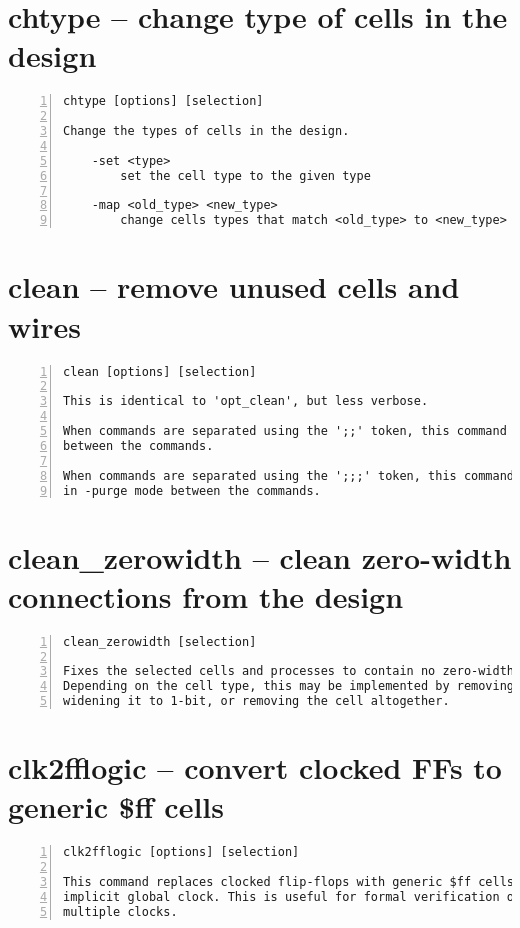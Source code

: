 \section{chtype -- change type of cells in the design}
\label{cmd:chtype}
\begin{lstlisting}[numbers=left,frame=single]
    chtype [options] [selection]

Change the types of cells in the design.

    -set <type>
        set the cell type to the given type

    -map <old_type> <new_type>
        change cells types that match <old_type> to <new_type>
\end{lstlisting}

\section{clean -- remove unused cells and wires}
\label{cmd:clean}
\begin{lstlisting}[numbers=left,frame=single]
    clean [options] [selection]

This is identical to 'opt_clean', but less verbose.

When commands are separated using the ';;' token, this command will be executed
between the commands.

When commands are separated using the ';;;' token, this command will be executed
in -purge mode between the commands.
\end{lstlisting}

\section{clean\_zerowidth -- clean zero-width connections from the design}
\label{cmd:clean_zerowidth}
\begin{lstlisting}[numbers=left,frame=single]
    clean_zerowidth [selection]

Fixes the selected cells and processes to contain no zero-width connections.
Depending on the cell type, this may be implemented by removing the connection,
widening it to 1-bit, or removing the cell altogether.
\end{lstlisting}

\section{clk2fflogic -- convert clocked FFs to generic \$ff cells}
\label{cmd:clk2fflogic}
\begin{lstlisting}[numbers=left,frame=single]
    clk2fflogic [options] [selection]

This command replaces clocked flip-flops with generic $ff cells that use the
implicit global clock. This is useful for formal verification of designs with
multiple clocks.
\end{lstlisting}

